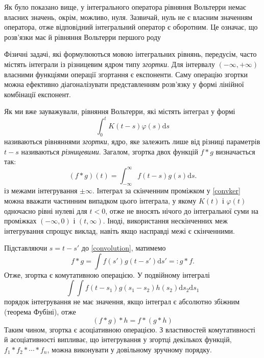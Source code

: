 \documentclass[14pt,twoside]{extreport}
\theoremstyle{mystyle}
\numberwithin{equation}{chapter}
\begin{document}
Як було показано вище, у інтегрального оператора рівняння Вольтерри немає власних значень, окрім, можливо, нуля. Зазвичай, нуль не є власним значенням оператора, отже відповідний інтегральний оператор є оборотним. Це означає, що розв'язки має й рівняння Вольтерри першого роду

Фізичні задачі, які формулюються мовою інтегральних рівнянь, передусім, часто містять інтеграли із різницевим ядром типу \emph{згортки}. Для інтервалу $(-\infty, +\infty)$ власними функціями операції згортання є експоненти. Саму операцію згортки можна ефективно діагоналізувати представленням розв'язку у формі лінійної комбінації експонент.

Як ми вже зауважували, рівняння Вольтерри, які містять інтеграл у формі
\begin{equation}\label{convker}
	\displaystyle \int_{0}^{t}K(t-s)\varphi(s)\mathrm{d}s
\end{equation}
називаються рівняннями \emph{згортки}, ядро, яке залежить лише від різниці параметрів $t-s$ називаються \emph{різницевими}. Загалом, згортка двох функцій $f*g$ визначається так:
\begin{equation}\label{convolution}
	(f*g)(t)=\displaystyle \int_{-\infty}^{\infty}f(t-s)g(s)\mathrm{d}s.
\end{equation}
із межами інтегрування $\pm\infty$. Інтеграл за скінченним проміжком у \eqref{convker} можна вважати частинним випадком цього інтеграла, у якому $K(t)$ і $\varphi(t)$ одночасно рівні нулеві для $t<0$, отже не вносять нічого до інтегральної суми на проміжках $(-\infty, 0)$ і $(t, \infty)$. Іноді, використання нескінченних меж інтегрування спрощує виклад, навіть якщо насправді межі є скінченними.

Підставляючи $s=t-s'$ до \eqref{convolution}, матимемо
\begin{equation}\label{convolution2}
	f*g=\displaystyle \int f(s')g(t-s')\mathrm{d}s'=:g*f.
\end{equation}
Отже, згортка є комутативною операцією. У подвійному інтегралі
\begin{equation*}
	\displaystyle \int\int f(t-s_{1})g(s_{1}-s_{2})h(s_{2})\mathrm{d}s_{2}\mathrm{d}s_{1}
\end{equation*}
порядок інтегрування не має значення, якщо інтеграл є абсолютно збіжним (теорема Фубіні), отже
\begin{equation*}
	(f*g)*h=f*(g*h)
\end{equation*}
Таким чином, згортка є асоціативною операцією. З властивостей комутативності й асоціативності випливає, що інтегрування у згортці декількох функцій, $f_{1}*f_{2}*\cdots*f_{n}$, можна виконувати у довільному зручному порядку.
\end{document}
